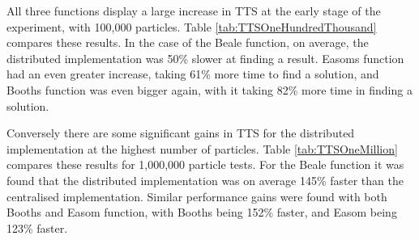 \documentclass[oneside,12pt]{book}
\begin{document}
All three functions display a large increase in TTS at the early stage of the experiment, with 100,000 particles. Table \ref{tab:TTSOneHundredThousand} compares these results. In the case of the Beale function, on average, the distributed implementation was 50\% slower at finding a result. Easoms function had an even greater increase, taking 61\% more time to find a solution, and Booths function was even bigger again, with it taking 82\% more time in finding a solution. 

\begin{table}[H]
  \caption{TTS Results for 100,000 Particles}    
  \label{tab:TTSOneHundredThousand}%
\end{table}%

Conversely there are some significant gains in TTS for the distributed implementation at the highest number of particles. Table \ref{tab:TTSOneMillion} compares these results for 1,000,000 particle tests. For the Beale function it was found that the distributed implementation was on average 145\% faster than the centralised implementation. Similar performance gains were found with both Booths and Easom function, with Booths being 152\% faster, and Easom being 123\% faster. 
\end{document}

